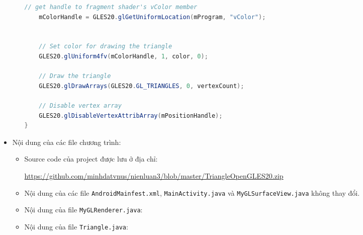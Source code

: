 \documentclass[13pt,a4paper]{extreport}
\begin{document}
\begin{itemize}
\begin{itemize}
\begin{lstlisting}[language=Java]
    // get handle to fragment shader's vColor member
    mColorHandle = GLES20.glGetUniformLocation(mProgram, "vColor");


    // Set color for drawing the triangle
    GLES20.glUniform4fv(mColorHandle, 1, color, 0);

    // Draw the triangle
    GLES20.glDrawArrays(GLES20.GL_TRIANGLES, 0, vertexCount);

    // Disable vertex array
    GLES20.glDisableVertexAttribArray(mPositionHandle);
}					
					\end{lstlisting}							
			\end{itemize}
		
		\item Nội dung của các file chương trình:
			\begin{itemize}
				\item Source code của project được lưu ở địa chỉ:
				
					\url{https://github.com/minhdatvnus/nienluan3/blob/master/TriangleOpenGLES20.zip}
				
				\item Nội dung của các file \verb|AndroidMainfest.xml|, \verb|MainActivity.java| và \verb|MyGLSurfaceView.java| không thay đổi.
				\item Nội dung của file \verb|MyGLRenderer.java|:
										
				
				\item Nội dung của file \verb|Triangle.java|:
					
			\end{itemize}			


\end{itemize}
\end{document}
